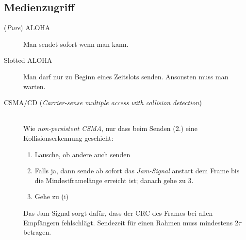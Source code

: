 \documentclass[a4paper]{article}
\begin{document}
\subsection{Medienzugriff}
\begin{description}
    \item[(\textit{Pure}) ALOHA] Man sendet sofort wenn man kann.
    \item[Slotted ALOHA] Man darf nur zu Beginn eines Zeitslots senden. Ansonsten muss man warten.
\end{description}
%
\begin{samepage}
\begin{description}
    \item[CSMA/CD (\textit{Carrier-sense multiple access with collision detection})] \hfill \\[8pt]
        Wie \textit{non-persistent CSMA}, nur dass beim Senden (2.) eine Kollisionserkennung geschieht:
        \begin{enumerate}[label=(\roman*)]
        \item Lausche, ob andere auch senden
        \item Falls ja, dann sende ab sofort das \textit{Jam-Signal} anstatt dem Frame bis die Mindestframelänge erreicht ist; danach gehe zu 3.
        \item Gehe zu (i)
    \end{enumerate}
    Das Jam-Signal sorgt dafür, dass der CRC des Frames bei allen Empfängern fehlschlägt. Sendezeit für einen Rahmen muss mindestens $2\tau$ betragen.
\end{description}
\end{samepage}
\end{document}
